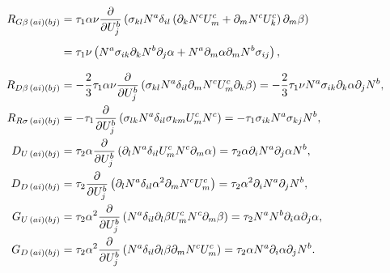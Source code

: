 \begin{align}
  R_{G \beta \, (ai)(bj)} & = \tau_1 \alpha \nu \frac{\partial }{\partial U_j^b} \left( \sigma_{kl} N^a \delta_{il} \left( \partial_k N^c U_m^c + \partial_m N^c U_k^c \right) \partial_m \beta \right) \notag                                                                                   \\
                          & = \vphantom{\frac{\partial }{\partial U_j^b}} \tau_1 \nu \left( N^a \sigma_{ik} \partial_k N^b \partial_j \alpha + N^a \partial_m \alpha \partial_m N^b \sigma_{ij} \right), \label{eq:RGBetaLHSStabilizationTerm}                                                   \\
  R_{D \beta \, (ai)(bj)} & = - \frac{2}{3} \tau_1 \alpha \nu \frac{\partial }{\partial U_j^b} \left( \sigma_{kl} N^a \delta_{il} \partial_m N^c U_m^c \partial_k \beta \right) = - \frac{2}{3} \tau_1 \nu N^a \sigma_{ik} \partial_k \alpha \partial_j N^b, \label{eq:RDBetaLHSStabilizationTerm} \\
  R_{R\sigma\, (ai)(bj)}  & = - \tau_1 \frac{\partial }{\partial U_j^b} \left( \sigma_{lk} N^a \delta_{il} \sigma_{km} U_m^c N^c \right) = - \tau_1 \sigma_{ik} N^a \sigma_{kj}N^b, \label{eq:RRSigmaLHSStabilizationTerm}                                                                       \\
  D_{U\, (ai)(bj)}        & = \tau_2 \alpha \frac{\partial }{\partial U_j^b} \left( \partial_l N^a \delta_{il} U_m^c N^c \partial_m \alpha \right) = \tau_2 \alpha \partial_i N^a \partial_j \alpha N^b, \label{eq:DULHSStabilizationTerm}                                                              \\
  D_{D\, (ai)(bj)}        & = \tau_2 \frac{\partial }{\partial U_j^b} \left( \partial_l N^a \delta_{il} \alpha^2 \partial_m N^c U_m^c \right) = \tau_2 \alpha^2 \partial_i N^a \partial_j N^b, \label{eq:DAlphaDLHSStabilizationTerm}                                                            \\
  G_{U\, (ai)(bj)}        & = \tau_2 \alpha^2 \frac{\partial }{\partial U_j^b} \left( N^a \delta_{il} \partial_l \beta U_m^c N^c \partial_m \beta \right) = \tau_2 N^a N^b \partial_i \alpha \partial_j \alpha, \label{eq:GULHSStabilizationTerm}                                                \\
  G_{D\, (ai)(bj)}        & = \tau_2 \alpha^2 \frac{\partial }{\partial U_j^b} \left( N^a \delta_{il} \partial_l \beta \partial_m N^c U_m^c \right) = \tau_2 \alpha N^a \partial_i \alpha \partial_j N^b. \label{eq:GAlphaDLHSStabilizationTerm}
\end{align}
\endgroup
